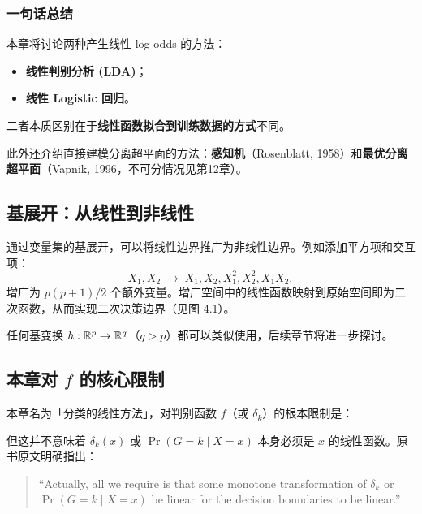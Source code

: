 \subsubsection{一句话总结}

\begin{center}
\end{center}

本章将讨论两种产生线性 log-odds 的方法：
\begin{itemize}
    \item \textbf{线性判别分析 (LDA)}；
    \item \textbf{线性 Logistic 回归}。
\end{itemize}
二者本质区别在于\textbf{线性函数拟合到训练数据的方式}不同。

此外还介绍直接建模分离超平面的方法：\textbf{感知机}（Rosenblatt, 1958）和\textbf{最优分离超平面}（Vapnik, 1996，不可分情况见第12章）。

\subsection{基展开：从线性到非线性}

通过变量集的基展开，可以将线性边界推广为非线性边界。例如添加平方项和交互项：
\begin{equation*}
    X_1, X_2 \;\longrightarrow\; X_1, X_2, X_1^2, X_2^2, X_1X_2,
\end{equation*}
增广为 $p(p+1)/2$ 个额外变量。增广空间中的线性函数映射到原始空间即为二次函数，从而实现二次决策边界（见图 4.1）。

任何基变换 $h: \mathbb{R}^p \to \mathbb{R}^q$（$q > p$）都可以类似使用，后续章节将进一步探讨。

\subsection{本章对 $f$ 的核心限制}

本章名为「分类的线性方法」，对判别函数 $f$（或 $\delta_k$）的根本限制是：

\begin{center}
\end{center}

但这并不意味着 $\delta_k(x)$ 或 $\Pr(G=k\mid X=x)$ 本身必须是 $x$ 的线性函数。原书原文明确指出：

\begin{quote}
``Actually, all we require is that some monotone transformation of $\delta_k$ or $\Pr(G = k \mid X = x)$ be linear for the decision boundaries to be linear.''
\end{quote}

